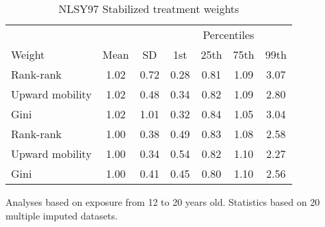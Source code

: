 \begin{table}[htp]
\centering
\footnotesize
\setlength{\tabcolsep}{10pt}
\renewcommand{\arraystretch}{1}
\begin{threeparttable}
\centering
\caption{NLSY97 Stabilized treatment weights} 
\label{tab:nlsy97_ipt_weigths}
\begin{tabular}{lcccccc}
  \hline
\multicolumn{3}{c}{} & \multicolumn{4}{c}{Percentiles} \\ 
 \cmidrule{4-7} 
Weight & Mean & SD & 1st & 25th & 75th & 99th \\ 
  \hline
\quad Rank-rank & 1.02 & 0.72 & 0.28 & 0.81 & 1.09 & 3.07 \\ 
  \quad Upward mobility & 1.02 & 0.48 & 0.34 & 0.82 & 1.09 & 2.80 \\ 
  \quad Gini & 1.02 & 1.01 & 0.32 & 0.84 & 1.05 & 3.04 \\ 
  \quad Rank-rank & 1.00 & 0.38 & 0.49 & 0.83 & 1.08 & 2.58 \\ 
  \quad Upward mobility & 1.00 & 0.34 & 0.54 & 0.82 & 1.10 & 2.27 \\ 
  \quad Gini & 1.00 & 0.41 & 0.45 & 0.80 & 1.10 & 2.56 \\ 
   \hline
\end{tabular}
\begin{tablenotes}
\footnotesize
\item Analyses based on exposure from 12 to 20 years old. Statistics based on  20 multiple imputed datasets.
\end{tablenotes}
\end{threeparttable}
\end{table}
